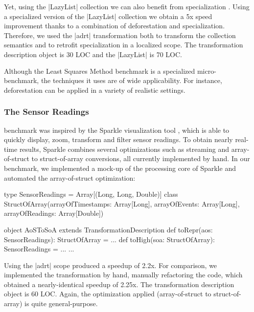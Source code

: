 Yet, using the |LazyList| collection we can also benefit from specialization \cite{iuli-thesis}. Using a specialized version of the |LazyList| collection we obtain a 5x speed improvement thanks to a combination of deforestation and specialization. Therefore, we used the |adrt| transformation both to transform the collection semantics and to retrofit specialization in a localized scope. The transformation description object is 30 LOC and the |LazyList| is 70 LOC.

Although the Least Squares Method benchmark is a specialized micro-benchmark, the techniques it uses are of wide applicability. For instance, deforestation can be applied in a variety of realistic settings. 



\subsubsection{The Sensor Readings} benchmark was inspired by the Sparkle visualization tool \cite{sparkle}, which is able to quickly display, zoom, transform and filter sensor readings. To obtain nearly real-time results, Sparkle combines several optimizations such as streaming and array-of-struct to struct-of-array conversions, all currently implemented by hand. In our benchmark, we implemented a mock-up of the processing core of Sparkle and automated the array-of-struct optimization:

\begin{lstlisting-nobreak}
type SensorReadings = Array[(Long, Long, Double)]
class StructOfArray(arrayOfTimestamps: Array[Long],
                           arrayOfEvents:     Array[Long],
                           arrayOfReadings:   Array[Double])

object AoSToSoA extends TransformationDescription {
  def toRepr(aos: SensorReadings): StructOfArray = ...
  def toHigh(soa: StructOfArray): SensorReadings = ...
  ...
}
\end{lstlisting-nobreak}

Using the |adrt| scope produced a 
speedup of 2.2x.
For comparison, we implemented the transformation by hand, manually refactoring the code, which obtained a nearly-identical speedup of 2.25x.
The transformation description object is 60 LOC. Again, the optimization applied (array-of-struct to struct-of-array) is quite general-purpose.


